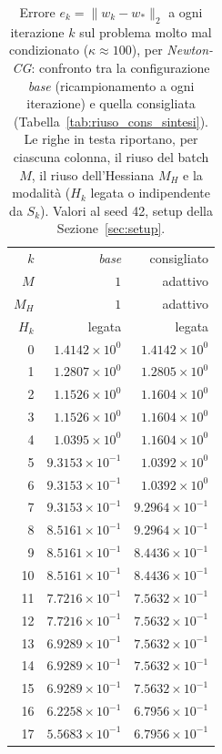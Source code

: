 \begin{table}[H]
\centering
\footnotesize
\renewcommand{\arraystretch}{0.85}
\setlength{\tabcolsep}{8pt}
\caption{Errore $e_k=\|w_k-w_*\|_2$ a ogni iterazione $k$ sul problema molto mal condizionato ($\kappa\approx 100$), per \emph{Newton-CG}: confronto tra la configurazione \emph{base} (ricampionamento a ogni iterazione) e quella consigliata (Tabella~\ref{tab:riuso_cons_sintesi}). Le righe in testa riportano, per ciascuna colonna, il riuso del batch $M$, il riuso dell'Hessiana $M_H$ e la modalità ($H_k$ legata o indipendente da $S_k$). Valori al seed 42, setup della Sezione~\ref{sec:setup}.}
\label{tab:riuso_cons_veryill_ncg}
\begin{tabular}{@{}rrr@{}}
\toprule
$k$ & \emph{base} & consigliato\\
$M$ & $1$ & adattivo\\
$M_H$ & $1$ & adattivo\\
$H_k$ & legata & legata\\
\midrule
0 & $1.4142\times10^{0}$ & $1.4142\times10^{0}$\\
1 & $1.2807\times10^{0}$ & $1.2805\times10^{0}$\\
2 & $1.1526\times10^{0}$ & $1.1604\times10^{0}$\\
3 & $1.1526\times10^{0}$ & $1.1604\times10^{0}$\\
4 & $1.0395\times10^{0}$ & $1.1604\times10^{0}$\\
5 & $9.3153\times10^{-1}$ & $1.0392\times10^{0}$\\
6 & $9.3153\times10^{-1}$ & $1.0392\times10^{0}$\\
7 & $9.3153\times10^{-1}$ & $9.2964\times10^{-1}$\\
8 & $8.5161\times10^{-1}$ & $9.2964\times10^{-1}$\\
9 & $8.5161\times10^{-1}$ & $8.4436\times10^{-1}$\\
10 & $8.5161\times10^{-1}$ & $8.4436\times10^{-1}$\\
11 & $7.7216\times10^{-1}$ & $7.5632\times10^{-1}$\\
12 & $7.7216\times10^{-1}$ & $7.5632\times10^{-1}$\\
13 & $6.9289\times10^{-1}$ & $7.5632\times10^{-1}$\\
14 & $6.9289\times10^{-1}$ & $7.5632\times10^{-1}$\\
15 & $6.9289\times10^{-1}$ & $7.5632\times10^{-1}$\\
16 & $6.2258\times10^{-1}$ & $6.7956\times10^{-1}$\\
17 & $5.5683\times10^{-1}$ & $6.7956\times10^{-1}$\\

\end{tabular}
\end{table}
